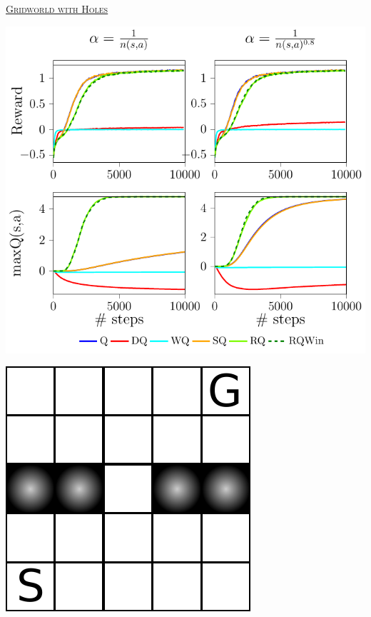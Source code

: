 \documentclass[portrait,a0paper,fontscale=0.312]{baposter}
\newcommand{\listhead}[1] {\textsc{\underline{#1}}}
\begin{document}
\begin{poster}
{\begin{minipage}{0.6\textwidth}
\begin{center}
\begin{minipage}{0.5\textwidth}
    \end{minipage}
  \end{center}
\end{minipage}
\begin{minipage}{0.45\textwidth}
  \begin{center}
    \listhead{Gridworld with Holes}\\
    \vspace{.1cm}
    \begin{minipage}{0.5\textwidth}
      \includegraphics[scale=0.50]{./imgs/gridHole/grid_hole.pdf}
    \end{minipage}
    \hspace{0.5cm}
    \begin{minipage}{0.4\textwidth}
      \includegraphics[scale=0.35]{./imgs/gridHole/gridhole.pdf}

\end{minipage}
\end{center}
\end{minipage}}
\end{poster}
\end{document}

